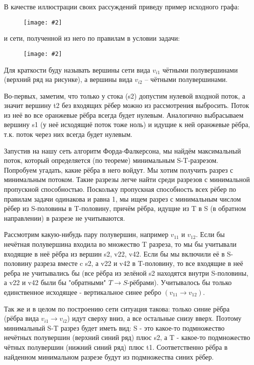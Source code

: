 \documentclass[a4paper,12pt]{article}
\numberwithin{figure}{section}
\newcommand\CenterFigure[2]{\begin{figure}[H]\centering\texttt{[image: \#2]}\end{figure}}
\begin{document}
\begin{solution}
	В качестве иллюстрации своих рассуждений приведу пример исходного графа:
	
	\CenterFigure{5cm}{flow-problem-step-12-fig1.png}
	
	и сети, полученной из него по правилам в условии задачи:
	
	\CenterFigure{13cm}{flow-problem-step-12-fig2.png}
	
	Для краткости буду называть вершины сети вида $v_{i1}$ чётными полувершинами (верхний ряд на рисунке), а вершины вида $v_{i2}$ -- чётными полувершинами.
	
	Во-первых, заметим, что только у стока (s2) допустим нулевой входной поток, а значит вершину t2 без входящих рёбер можно из рассмотрения выбросить. Поток из неё во все оранжевые рёбра всегда будет нулевым. Аналогично выбрасываем вершину s1 (у неё исходящиё поток тоже ноль) и идущие к ней оранжевые рёбра, т.к. поток через них всегда будет нулевым.
	
	Запустив на нашу сеть алгоритм Форда-Фалкерсона, мы найдём максимальный поток, который определяется (по теореме) минимальным S-T-разрезом. Попробуем угадать, какие рёбра в него войдут. Мы хотим получить разрез с минимальным потоком. Такие разрезы легче найти среди разрезов с минимальной пропускной способностью. Поскольку пропускная способность всех рёбер по правилам задачи одинакова и равна 1, мы ищем разрез с минимальным числом рёбер из S-половины в T-половину, причём рёбра, идущие из T в S (в обратном направлении) в разрезе не учитываются.
	
	Рассмотрим какую-нибудь пару полувершин, например $v_{11}$ и $v_{12}$. Если бы нечётная полувершина входила во множество T разреза, то мы бы учитывали входящие в неё рёбра из вершин s2, v22, v42. Если бы мы включили её в S-половину разреза вместе c s2, а v22 и v42 в T-половину, то все входящие в неё ребра не учитывались бы (все рёбра из зелёной s2 находятся внутри S-половины, а v22 и v42 были бы "обратными" $T \rightarrow S$-рёбрами). Учитывалось бы только единственное исходящее - вертикальное синее ребро $(v_{11} \rightarrow v_{12})$.
	
	Так же и в целом по построению сети ситуация такова: только синие рёбра (рёбра вида $v_{i1} \rightarrow v_{i2}$) идут сверху вниз, а все остальные снизу вверх. Поэтому минимальный S-T разрез будет иметь вид: S - это какое-то подмножество нечётных полувершин (верхний синий ряд) плюс s2, а T - какое-то подмножество чётных полувершин (нижний синий ряд) плюс t1. Соответственно рёбра в найденном минимальном разрезе будут из подмножества синих рёбер.
	

\end{solution}
\end{document}
